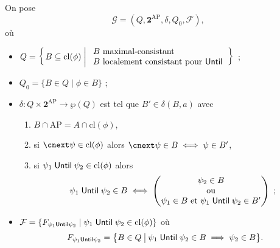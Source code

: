 \documentclass[./main]{subfiles}
\begin{document}
  \begin{defn}
    On pose \[
      \mathcal{G} = (Q, \mathbf{2}^\mathrm{AP}, \delta, Q_0, \mathcal{F})
    ,\] 
    où
    \begin{itemize}
      \item $Q = \mleft\{\,B \subseteq \mathrm{cl}(\phi) \;\middle|\;
        \begin{array}{l}
          \text{$B$ maximal-consistant}\\
          \text{$B$ localement consistant pour $\until$}
        \end{array}\,\mright\}$ ;
      \item $Q_0 = \{B \in Q  \mid \phi \in B\}$ ;
      \item $\delta : Q \times \mathbf{2}^\mathrm{AP} \to \wp(Q)$ est tel que $B' \in \delta(B, a)$ avec
        \begin{enumerate}
          \item $B \cap \mathrm{AP} = A \cap \mathrm{cl}(\phi)$,
          \item si $\nxt \psi \in \mathrm{cl}(\phi)$ alors $\nxt\psi \in B \iff\psi \in B'$,
          \item si $\psi_1 \mathrel{\mathsf{Until}} \psi_2 \in \mathrm{cl}(\phi)$ alors
            \[
              \psi_1 \mathrel{\mathsf{Until}} \psi_2 \in B \iff
              \begin{pmatrix} \psi_2 \in B \\
              \text{ou}\\
            \psi_1 \in B \text{ et } \psi_1 \mathrel{\mathsf{Until}} \psi_2 \in B'\end{pmatrix} 
            \;;\]
        \end{enumerate}
      \item $\mathcal{F} = \{F_{\psi_1 \mathrel{\mathsf{Until}} \psi_2}  \mid \psi_1 \mathrel{\mathsf{Until}} \psi_2 \in \mathrm{cl}(\phi)\}$
        où
        \[
        F_{\psi_1 \mathrel{\mathsf{Until}} \psi_2} = \big\{ B \in Q \:\big|\: \psi_1 \mathrel{\mathsf{Until}} \psi_2 \in B \implies \psi_2 \in B \big\} 
        .\]
    \end{itemize}
  \end{defn}
\end{document}
